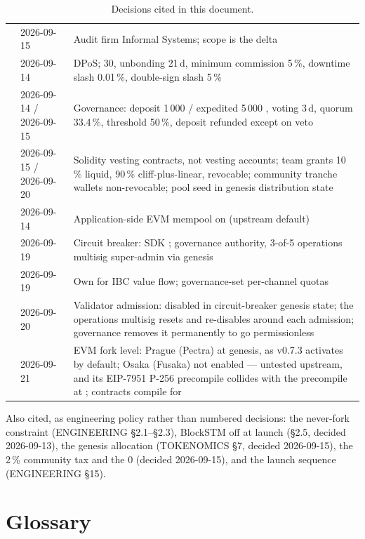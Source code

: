 \begin{table}[H]
\begin{tabularx}{\textwidth}{@{}llL@{}}
 & 2026-09-15 & Audit firm Informal Systems; scope is the delta \\
 & 2026-09-14 & DPoS;  30, unbonding 21\,d, minimum commission 5\,\%, downtime slash 0.01\,\%, double-sign slash 5\,\% \\
 & 2026-09-14 / 2026-09-15 & Governance: deposit 1\,000 / expedited 5\,000 \kash{}, voting 3\,d, quorum 33.4\,\%, threshold 50\,\%, deposit refunded except on veto \\
 & 2026-09-15 / 2026-09-20 & Solidity vesting contracts, not  vesting accounts; team grants 10\,\% liquid, 90\,\% cliff-plus-linear, revocable; community tranche wallets non-revocable; pool seed in genesis distribution state \\
 & 2026-09-14 & Application-side EVM mempool on (upstream default) \\
 & 2026-09-19 & Circuit breaker: SDK ; governance authority, 3-of-5 operations multisig super-admin via genesis \\
 & 2026-09-19 & Own  for IBC value flow; governance-set per-channel quotas \\
 & 2026-09-20 & Validator admission:  disabled in circuit-breaker genesis state; the operations multisig resets and re-disables around each admission; governance removes it permanently to go permissionless \\
 & 2026-09-21 & EVM fork level: Prague (Pectra) at genesis, as  v0.7.3 activates by default; Osaka (Fusaka) not enabled --- untested upstream, and its EIP-7951 P-256 precompile collides with the  precompile at ; contracts compile for  \\
\bottomrule
\end{tabularx}
\caption{Decisions cited in this document.}
\end{table}

Also cited, as engineering policy rather than numbered decisions: the
never-fork constraint (ENGINEERING \S2.1--\S2.3), BlockSTM off at launch
(\S2.5, decided 2026-09-13), the genesis allocation (TOKENOMICS \S7, decided
2026-09-15), the 2\,\% community tax and the 0  (decided
2026-09-15), and the launch sequence (ENGINEERING \S15).

\section{Glossary}

